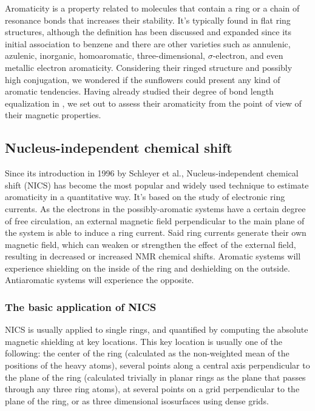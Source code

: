 Aromaticity is a property related to molecules that contain a ring or a chain of resonance bonds that increases their stability.
It’s typically found in flat ring structures, although the definition has been discussed and expanded since its initial association to benzene and there are other varieties such as annulenic, azulenic, inorganic, homoaromatic, three-dimensional, $\sigma$-electron, and even metallic electron aromaticity.
Considering their ringed structure and possibly high conjugation, we wondered if the sunflowers could present any kind of aromatic tendencies.
Having already studied their degree of bond length equalization in , we set out to assess their aromaticity from the point of view of their magnetic properties.

\subsection{Nucleus-independent chemical shift}
Since its introduction in 1996 by Schleyer et al., Nucleus-independent chemical shift (NICS) has become the most popular and widely used technique to estimate aromaticity in a quantitative way.
It's based on the study of electronic ring currents.
As the electrons in the possibly-aromatic systems have a certain degree of free circulation, an external magnetic field perpendicular to the main plane of the system is able to induce a ring current.
Said ring currents generate their own magnetic field, which can weaken or strengthen the effect of the external field, resulting in decreased or increased NMR chemical shifts.
Aromatic systems will experience shielding on the inside of the ring and deshielding on the outside.
Antiaromatic systems will experience the opposite.

\subsubsection{The basic application of NICS}
NICS is usually applied to single rings, and quantified by computing the absolute magnetic shielding at key locations.
This key location is usually one of the following: the center of the ring (calculated as the non-weighted mean of the positions of the heavy atoms), several points along a central axis perpendicular to the plane of the ring (calculated trivially in planar rings as the plane that passes through any three ring atoms), at several points on a grid perpendicular to the plane of the ring, or as three dimensional isosurfaces using dense grids.

